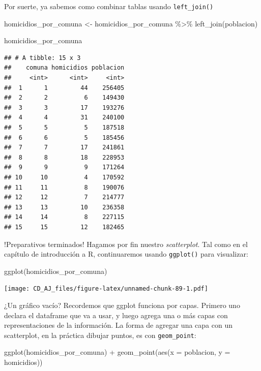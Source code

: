 \documentclass[
]{book}
\newenvironment{Shaded}{\begin{snugshade}}{\end{snugshade}}
\newcommand{\AttributeTok}[1]{\textcolor[rgb]{0.77,0.63,0.00}{#1}}
\newcommand{\FunctionTok}[1]{\textcolor[rgb]{0.00,0.00,0.00}{#1}}
\newcommand{\NormalTok}[1]{#1}
\newcommand{\OtherTok}[1]{\textcolor[rgb]{0.56,0.35,0.01}{#1}}
\newcommand{\SpecialCharTok}[1]{\textcolor[rgb]{0.00,0.00,0.00}{#1}}
\begin{document}
Por suerte, ya sabemos como combinar tablas usando \texttt{left\_join()}

\begin{Shaded}
\begin{Highlighting}[]
\NormalTok{homicidios\_por\_comuna }\OtherTok{\textless{}{-}}\NormalTok{ homicidios\_por\_comuna }\SpecialCharTok{\%\textgreater{}\%} \FunctionTok{left\_join}\NormalTok{(poblacion)}

\NormalTok{homicidios\_por\_comuna}
\end{Highlighting}
\end{Shaded}

\begin{verbatim}
## # A tibble: 15 x 3
##    comuna homicidios poblacion
##     <int>      <int>     <int>
##  1      1         44    256405
##  2      2          6    149430
##  3      3         17    193276
##  4      4         31    240100
##  5      5          5    187518
##  6      6          5    185456
##  7      7         17    241861
##  8      8         18    228953
##  9      9          9    171264
## 10     10          4    170592
## 11     11          8    190076
## 12     12          7    214777
## 13     13         10    236358
## 14     14          8    227115
## 15     15         12    182465
\end{verbatim}

!Preparativos terminados! Hagamos por fin nuestro \emph{scatterplot}. Tal como en el capítulo de introducción a R, continuaremos usando \texttt{ggplot()} para visualizar:

\begin{Shaded}
\begin{Highlighting}[]
\FunctionTok{ggplot}\NormalTok{(homicidios\_por\_comuna)}
\end{Highlighting}
\end{Shaded}

\texttt{[image: CD\_AJ\_files/figure-latex/unnamed-chunk-89-1.pdf]}

¿Un gráfico vacío? Recordemos que ggplot funciona por capas. Primero uno declara el dataframe que va a usar, y luego agrega una o más capas con representaciones de la información. La forma de agregar una capa con un scatterplot, en la práctica dibujar puntos, es con \texttt{geom\_point}:

\begin{Shaded}
\begin{Highlighting}[]
\FunctionTok{ggplot}\NormalTok{(homicidios\_por\_comuna) }\SpecialCharTok{+} \FunctionTok{geom\_point}\NormalTok{(}\FunctionTok{aes}\NormalTok{(}\AttributeTok{x =}\NormalTok{ poblacion, }\AttributeTok{y =}\NormalTok{ homicidios))}
\end{Highlighting}
\end{Shaded}
\end{document}
